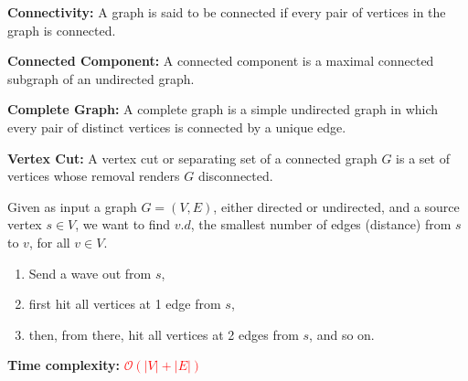 \documentclass[a4paper,landscape]{article}
\newcommand{\timecomplexity}[1]{\textcolor{red}{#1}}
\newcommand{\bigo}{\mathcal{O}}
\begin{document}
\begin{multicols}{7}
\textbf{Connectivity:} A graph is said to be connected if every pair of vertices in the graph is connected.



\textbf{Connected Component:} A connected component is a maximal connected subgraph of an undirected graph.



\textbf{Complete Graph:} A complete graph is a simple undirected graph in which every pair of distinct vertices is connected by a unique edge.



\textbf{Vertex Cut:} A vertex cut or separating set of a connected graph $G$ is a set of vertices whose removal renders $G$ disconnected.
\endtcolorbox

\tcolorbox[mybox={Breadth-First Search}]
Given as input a graph $G = (V, E)$, either directed or undirected, and a source
vertex $s \in V$, we want to find $v.d$, the smallest number of edges (distance)
from $s$ to $v$, for all $v \in V$.

\begin{enumerate}[noitemsep, topsep=0pt]
    \item Send a wave out from $s$,
    \item first hit all vertices at 1 edge from $s$,
    \item then, from there, hit all vertices at 2 edges from $s$, and so on.
\end{enumerate}

\noindent %
\textbf{Time complexity:} \timecomplexity{\(\bigo(|V| + |E|)\)} \quad
\endtcolorbox


\end{multicols}
\end{document}

